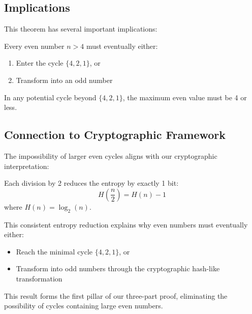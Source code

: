 \subsection{Implications}

This theorem has several important implications:

\begin{corollary}
Every even number $n > 4$ must eventually either:
\begin{enumerate}
\item Enter the cycle $\{4,2,1\}$, or
\item Transform into an odd number
\end{enumerate}
\end{corollary}

\begin{corollary}
In any potential cycle beyond $\{4,2,1\}$, the maximum even value must be 4 or less.
\end{corollary}

\subsection{Connection to Cryptographic Framework}

The impossibility of larger even cycles aligns with our cryptographic interpretation:

\begin{proposition}
Each division by 2 reduces the entropy by exactly 1 bit:
\[
H\left(\frac{n}{2}\right) = H(n) - 1
\]
where $H(n) = \log_2(n)$.
\end{proposition}

This consistent entropy reduction explains why even numbers must eventually either:
\begin{itemize}
\item Reach the minimal cycle $\{4,2,1\}$, or
\item Transform into odd numbers through the cryptographic hash-like transformation
\end{itemize}

This result forms the first pillar of our three-part proof, eliminating the possibility of cycles containing large even numbers. 